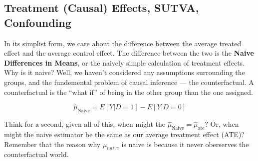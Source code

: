 \documentclass[12pt]{article}\usepackage[]{graphicx}\usepackage[]{color}
\begin{document}
\begin{flushleft}
\begin{center}
\end{center}





\subsection{Treatment (Causal) Effects, SUTVA, Confounding}

In its simplist form, we care about the difference between the average treated effect and the average control effect. The difference between the two is the \textbf{Naive Differences in Means}, or the naively simple calculation of treatment effects. Why is it naive? Well, we haven't considered any assumptions surrounding the groups, and the fundemental problem of causal inference --- the counterfactual. A counterfactual is the ``what if'' of being in the other group than the one assigned. 

\begin{equation}
\hat{\mu}_\text{Naive} = E[Y|D=1] - E[Y|D=0]
\end{equation}


Think for a second, given all of this, when might the $\hat{\mu}_\text{Naive} = \hat{\mu}_\text{ate}$? Or, when might the naive estimator be the same as our average treatment effect (ATE)? Remember that the reason why $\mu_{naive}$ is naive is because it never oberserves the counterfactual world.


\end{flushleft}
\end{document}
